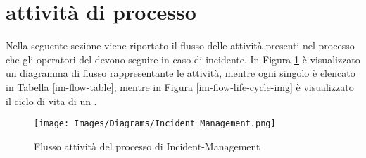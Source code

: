 %
%
\section[Attività di processo]{attività di processo}
\label{im-flow}
Nella seguente sezione viene riportato il flusso delle attività presenti nel processo che gli operatori del  devono seguire in caso di incidente. In Figura \ref{im-flow-img} è visualizzato un diagramma di flusso rappresentante le attività, mentre ogni singolo  è elencato in Tabella \ref{im-flow-table}, mentre in Figura \ref{im-flow-life-cycle-img} è visualizzato il ciclo di vita di un .

\begin{figure}[htbp]
\centering
\texttt{[image: Images/Diagrams/Incident\_Management.png]}
\caption{Flusso attività del processo di \ac{Incident-Management}}
\label{im-flow-img}
\end{figure}

